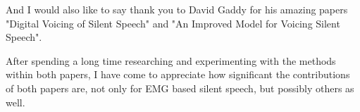 \documentclass[12pt, a4paper]{report}
\begin{document}
And I would also like to say thank you to David Gaddy for his amazing papers
"Digital Voicing of Silent Speech" and
"An Improved Model for Voicing Silent Speech".

After spending a long time researching and experimenting with the methods within
both papers, I have come to appreciate how significant the contributions of both
papers are, not only for EMG based silent speech, but possibly others as well.
\newpage














\newpage
{}
{}
\printbibliography
\end{document}
